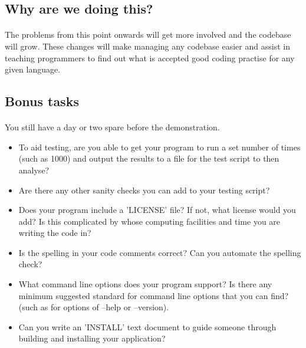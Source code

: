 \documentclass[11pt]{book}
\begin{document}
\subsection{Why are we doing this?}

\paragraph{} The problems from this point onwards will get more involved and the codebase will grow. These changes will make managing any codebase easier and assist in teaching programmers to find out what is accepted good coding practise for any given language.

\subsection{Bonus tasks}

\paragraph{} You still have a day or two spare before the demonstration.

\begin{itemize}
\item To aid testing, are you able to get your program to run a set number of times (such as 1000) and output the results to a file for the test script to then analyse?
\item Are there any other sanity checks you can add to your testing script?
\item Does your program include a 'LICENSE' file? If not, what license would you add? Is this complicated by whose computing facilities and time you are writing the code in?
\item Is the spelling in your code comments correct? Can you automate the spelling check?
\item What command line options does your program support? Is there any minimum suggested standard for command line options that you can find? (such as for options of --help or --version).
\item Can you write an 'INSTALL' text document to guide someone through building and installing your application?
\end{itemize}

\clearpage
\end{document}
